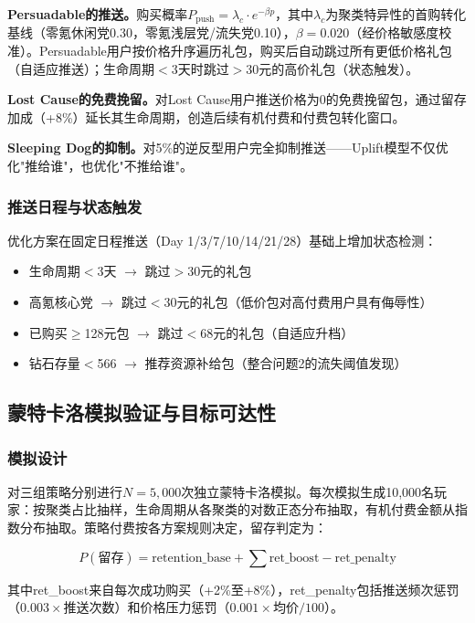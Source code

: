 \textbf{Persuadable的推送。}购买概率$P_{\text{push}} = \lambda_c \cdot e^{-\beta p}$，其中$\lambda_c$为聚类特异性的首购转化基线（零氪休闲党0.30，零氪浅层党/流失党0.10），$\beta=0.020$（经价格敏感度校准）。Persuadable用户按价格升序遍历礼包，购买后自动跳过所有更低价格礼包（自适应推送）；生命周期$<$3天时跳过$>$30元的高价礼包（状态触发）。

\textbf{Lost Cause的免费挽留。}对Lost Cause用户推送价格为0的免费挽留包，通过留存加成（+8\%）延长其生命周期，创造后续有机付费和付费包转化窗口。

\textbf{Sleeping Dog的抑制。}对5\%的逆反型用户完全抑制推送——Uplift模型不仅优化"推给谁"，也优化"不推给谁"。

\subsubsection{推送日程与状态触发}

优化方案在固定日程推送（Day 1/3/7/10/14/21/28）基础上增加状态检测：
\begin{itemize}
    \item 生命周期$<$3天 $\to$ 跳过$>$30元的礼包
    \item 高氪核心党 $\to$ 跳过$<$30元的礼包（低价包对高付费用户具有侮辱性）
    \item 已购买$\geq$128元包 $\to$ 跳过$<$68元的礼包（自适应升档）
    \item 钻石存量$<$566 $\to$ 推荐资源补给包（整合问题2的流失阈值发现）
\end{itemize}

\subsection{蒙特卡洛模拟验证与目标可达性}

\subsubsection{模拟设计}

对三组策略分别进行$N=5,000$次独立蒙特卡洛模拟\cite{hammersley1964}。每次模拟生成10,000名玩家：按聚类占比抽样，生命周期从各聚类的对数正态分布抽取，有机付费金额从指数分布抽取。策略付费按各方案规则决定，留存判定为：

\begin{equation}
P(\text{留存}) = \text{retention\_base} + \sum\text{ret\_boost} - \text{ret\_penalty}
\end{equation}

其中ret\_boost来自每次成功购买（+2\%至+8\%），ret\_penalty包括推送频次惩罚（$0.003\times\text{推送次数}$）和价格压力惩罚（$0.001\times\text{均价}/100$）。

